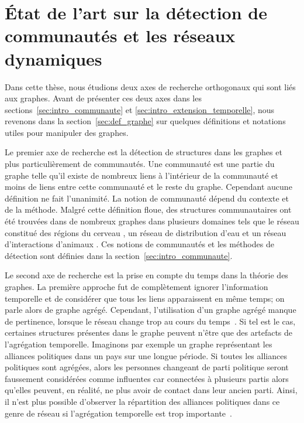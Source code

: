 
\chapter{État de l'art sur la détection de communautés et les réseaux dynamiques}
\minitoc
\label{chap:etat_art}
Dans cette thèse, nous étudions deux axes de recherche orthogonaux qui sont liés aux graphes.
Avant de présenter ces deux axes dans les sections~\ref{sec:intro_communaute} et \ref{sec:intro_extension_temporelle}, nous revenons dans la section~\ref{sec:def_graphe} sur quelques définitions et notations utiles pour manipuler des graphes.

Le premier axe de recherche est la détection de structures dans les graphes et plus particulièrement de communautés.
Une communauté est une partie du graphe telle qu'il existe de nombreux liens à l'intérieur de la communauté et moins de liens entre cette communauté et le reste du graphe.
Cependant aucune définition ne fait l'unanimité.
La notion de communauté dépend du contexte et de la méthode.
Malgré cette définition floue, des structures communautaires ont été trouvées dans de nombreux graphes dans plusieurs domaines tels que le réseau constitué des régions du cerveau \cite{DeReus2014}, un réseau de distribution d'eau \cite{DiNardo2015} et un réseau d'interactions d'animaux \cite{Farine2015}.
Ces notions de communautés et les méthodes de détection sont définies dans la section~\ref{sec:intro_communaute}.

Le second axe de recherche est la prise en compte du temps dans la théorie des graphes.
La première approche fut de complètement ignorer l'information temporelle et de considérer que tous les liens apparaissent en même temps; on parle alors de graphe agrégé.
Cependant, l'utilisation d'un graphe agrégé manque de pertinence, lorsque le réseau change trop au cours du temps~\cite{Holme2015b}.
Si tel est le cas, certaines structures présentes dans le graphe peuvent n'être que des artefacts de l'agrégation temporelle.
Imaginons par exemple un graphe représentant les alliances politiques dans un pays sur une longue période.
Si toutes les alliances politiques sont agrégées, alors les personnes changeant de parti politique seront faussement considérées comme influentes car connectées à plusieurs partis alors qu'elles peuvent, en réalité, ne plus avoir de contact dans leur ancien parti.
Ainsi, il n'est plus possible d'observer la répartition des alliances politiques dans ce genre de réseau si l'agrégation temporelle est trop importante~\cite{Mucha2010}.

